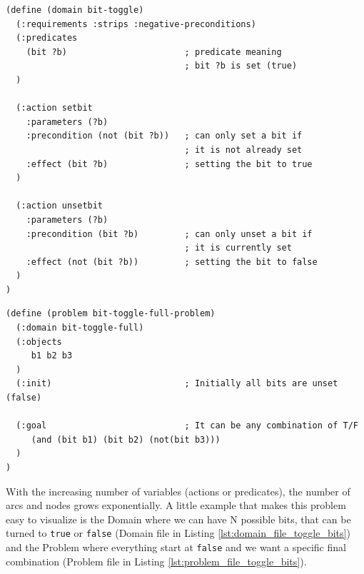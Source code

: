 \vspace{10mm}
\begin{codewindow}
    \begin{lstlisting}
(define (domain bit-toggle)
  (:requirements :strips :negative-preconditions)
  (:predicates
    (bit ?b)                       ; predicate meaning
                                   ; bit ?b is set (true)
  )

  (:action setbit
    :parameters (?b)
    :precondition (not (bit ?b))   ; can only set a bit if
                                   ; it is not already set
    :effect (bit ?b)               ; setting the bit to true
  )

  (:action unsetbit
    :parameters (?b)
    :precondition (bit ?b)         ; can only unset a bit if
                                   ; it is currently set
    :effect (not (bit ?b))         ; setting the bit to false
  )
)

\end{lstlisting}
\end{codewindow}
\vspace{10mm}

\vspace{10mm}
\begin{codewindow}
    \begin{lstlisting}
(define (problem bit-toggle-full-problem)
  (:domain bit-toggle-full)
  (:objects
     b1 b2 b3
  )
  (:init)                          ; Initially all bits are unset (false)

  (:goal                           ; It can be any combination of T/F
     (and (bit b1) (bit b2) (not(bit b3)))
  )
)
\end{lstlisting}
\end{codewindow}
\vspace{10mm}

With the increasing number of variables (actions or predicates), the number of
arcs and nodes grows exponentially. A little example that makes this problem easy
to visualize is the Domain where we can have N possible bits, that can be turned
to \texttt{true} or \texttt{false} (Domain file in Listing \ref{lst:domain_file_toggle_bits})
and the Problem where everything start at \texttt{false} and we want a specific final
combination (Problem file in Listing \ref{lst:problem_file_toggle_bits}).

